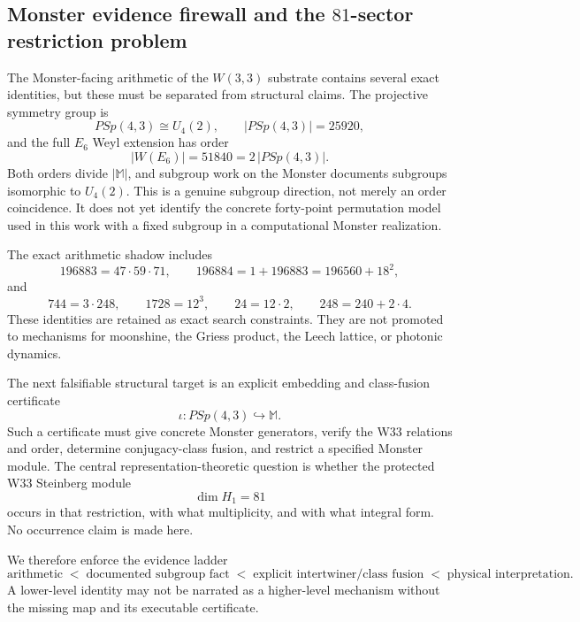 \subsection{Monster evidence firewall and the $81$-sector restriction problem}
\label{sec:monster-evidence-firewall}

The Monster-facing arithmetic of the $W(3,3)$ substrate contains several exact identities,
but these must be separated from structural claims.  The projective symmetry group is
\[
PSp(4,3)\cong U_4(2),\qquad |PSp(4,3)|=25920,
\]
and the full $E_6$ Weyl extension has order
\[
|W(E_6)|=51840=2\,|PSp(4,3)|.
\]
Both orders divide $|\mathbb M|$, and subgroup work on the Monster documents subgroups
isomorphic to $U_4(2)$.  This is a genuine subgroup direction, not merely an order
coincidence.  It does not yet identify the concrete forty-point permutation model used in
this work with a fixed subgroup in a computational Monster realization.

The exact arithmetic shadow includes
\[
196883=47\cdot59\cdot71,
\qquad
196884=1+196883=196560+18^2,
\]
and
\[
744=3\cdot248,
\qquad
1728=12^3,
\qquad
24=12\cdot2,
\qquad
248=240+2\cdot4.
\]
These identities are retained as exact search constraints.  They are not promoted to
mechanisms for moonshine, the Griess product, the Leech lattice, or photonic dynamics.

The next falsifiable structural target is an explicit embedding and class-fusion certificate
\[
\iota:PSp(4,3)\hookrightarrow\mathbb M.
\]
Such a certificate must give concrete Monster generators, verify the W33 relations and
order, determine conjugacy-class fusion, and restrict a specified Monster module.  The
central representation-theoretic question is whether the protected W33 Steinberg module
\[
\dim H_1=81
\]
occurs in that restriction, with what multiplicity, and with what integral form.  No
occurrence claim is made here.

We therefore enforce the evidence ladder
\[
\text{arithmetic}\;<\;\text{documented subgroup fact}\;<\;
\text{explicit intertwiner/class fusion}\;<\;\text{physical interpretation}.
\]
A lower-level identity may not be narrated as a higher-level mechanism without the missing
map and its executable certificate.
